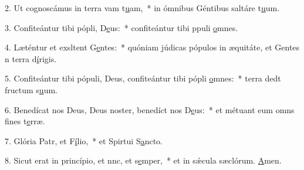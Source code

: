 2. Ut cognoscámus in terra vam t\uline{u}am,~* in ómnibus Géntibus saltáre t\uline{u}um.\par 
3. Confiteántur tibi pópli, D\uline{e}us:~* confiteántur tibi ppuli \uline{o}mnes.\par 
4. Læténtur et exsltent G\uline{e}ntes:~* quóniam júdicas pópulos in æquitáte, et Gentes n terra d\uline{í}rigis.\par 
5. Confiteántur tibi pópuli, Deus, confiteántur tibi pópli \uline{o}mnes:~* terra dedt fructum s\uline{u}um.\par 
6. Benedícat nos Deus, Deus noster, benedíct nos D\uline{e}us:~* et métuant eum omns fines t\uline{e}rræ.\par 
7. Glória Patr, et F\uline{í}lio,~* et Spirtui S\uline{a}ncto.\par 
8. Sicut erat in princípio, et nnc, et s\uline{e}mper,~* et in sǽcula sæclórum. \uline{A}men.\par 
